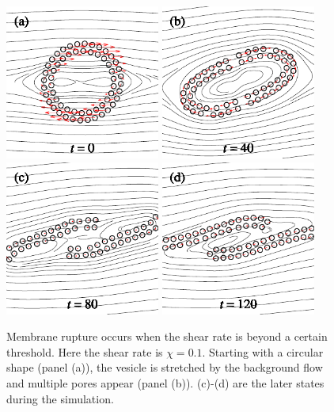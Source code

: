 \documentclass[lineno]{jfm}
\begin{document}
\begin{figure}
\centering
\includegraphics[height=2in]{N58_rupt_0.pdf}
\includegraphics[height=2in]{N58_rupt_200.pdf}
\\
\includegraphics[height=2in]{N58_rupt_400.pdf}
\includegraphics[height=2in]{N58_rupt_600.pdf}
  \caption{Membrane rupture occurs when the shear rate is beyond a certain threshold. Here the shear rate is $\chi = 0.1$. Starting with a circular shape (panel (a)), the vesicle is stretched by the background flow and multiple pores appear (panel (b)). (c)-(d) are the later states during the simulation.
  }
    \label{figure8}
\end{figure}
\end{document}
